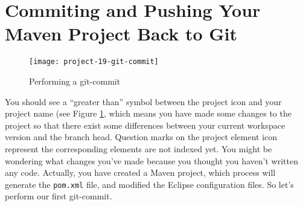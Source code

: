 
\section{Commiting and Pushing Your Maven Project Back to Git}

\begin{figure}[t]
\centering
\texttt{[image: project-19-git-commit]}
\caption{Performing a git-commit\label{project-19-git-commit}}
\end{figure}

You should see a ``greater than'' symbol between the project icon and your project name (see Figure \ref{project-19-git-commit}, which means you have made some changes to the project so that there exist some differences between your current workspace version and the branch head. Question marks on the project element icon represent the corresponding elements are not indexed yet. You might be wondering what changes you've made because you thought you haven't written any code. Actually, you have created a Maven project, which process will generate the \verb|pom.xml| file, and modified the Eclipse configuration files. So let's perform our first git-commit.

